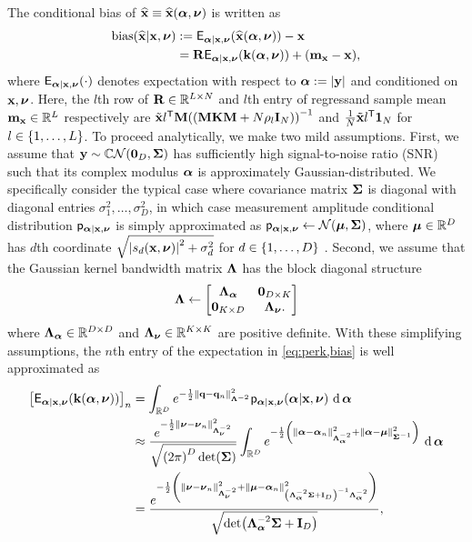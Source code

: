 The conditional bias 
of $\est{\bmx} \equiv \esta{\bmx}{\bmymag,\bmnu}$
is written as
\begin{align}
	\biasa{\est{\bmx}|\bmx,\bmnu} 
		&:= 
			\expect{\bmymag|\bmx,\bmnu}{\esta{\bmx}{\bmymag,\bmnu}} - \bmx
			\nonumber \\
		&= 
			\bmR \expect{\bmymag|\bmx,\bmnu}{\bmka{\bmymag,\bmnu}} 
			+ \paren{\bmmx-\bmx},
			\label{eq:perk,bias}
\end{align}
where $\expect{\bmymag|\bmx,\bmnu}{\cdot}$ 
denotes expectation
with respect to $\bmymag := \abs{\bmy}$
and conditioned on $\mathbf{x},\boldsymbol{\nu}$.
Here,
the $l$th row of $\mathbf{R} \in \mathbb{R}^{L \times N}$ 
and $l$th entry of regressand sample mean 
$\mathbf{m}_{\mathbf{x}} \in \mathbb{R}^{L}$
respectively are $\bmxt{l}\tpose \bmM\inv{\paren{\bmM\bmK\bmM + N \rho_l \eye{N}}}$
and $\frac{1}{N}\tilde{\mathbf{x}}{l}^{\mathsf{T}}\boldsymbol{1}_{N}$
for $l \in \set{1,\dots,L}$.
To proceed analytically, 
we make two mild assumptions.
First, 
we assume 
that $\bmy \sim \cgauss{\zeros{D}}{\bmSig}$
has sufficiently high signal-to-noise ratio (SNR)
such that its complex modulus $\boldsymbol{\alpha}$ 
is approximately Gaussian-distributed.
We specifically consider the typical case
where covariance matrix $\boldsymbol{\Sigma}$ is diagonal
with diagonal entries $\sigma_1^2,\dots,\sigma_D^2$,
in which case measurement amplitude conditional distribution 
$\mathsf{p}_{\boldsymbol{\alpha}|\mathbf{x},\boldsymbol{\nu}}$
is simply approximated as
$\dist{\bmymag|\bmx,\bmnu} \gets \gauss{\bmmu}{\bmSig}$,
where $\boldsymbol{\mu} \in \mathbb{R}^{D}$ 
has $d$th coordinate $\sqrt{\abs{s_d\paren{\bmx,\bmnu}}^2 + \sigma_d^2}$ 
for $d \in \set{1,\dots,D}$ \cite{gudbjartsson:95:trd}.
Second,
we assume
that the Gaussian kernel bandwidth matrix $\boldsymbol{\Lambda}$ 
has the block diagonal structure
\begin{align}
	\boldsymbol{\Lambda} \gets 
		\begin{bmatrix}
			\boldsymbol{\Lambda}_{\boldsymbol{\alpha}} & \boldsymbol{0}_{D \times K} \\
			\boldsymbol{0}_{K \times D} & \boldsymbol{\Lambda}_{\boldsymbol{\nu}}.
		\end{bmatrix}
	\label{eq:perk,sep-bw}
\end{align}
where $\boldsymbol{\Lambda}_{\boldsymbol{\alpha}} \in \mathbb{R}^{D \times D}$
and $\boldsymbol{\Lambda}_{\boldsymbol{\nu}} \in \mathbb{R}^{K \times K}$ 
are positive definite.
With these simplifying assumptions,
the $n$th entry 
of the expectation in \eqref{eq:perk,bias}
is well approximated as
\begin{align}
	\brac{\expect{\bmymag|\bmx,\bmnu}{\bmka{\bmymag,\bmnu}}}_n
		&=
			\int_{\reals{D}} e^{%
				-\frac{1}{2} \norm{\bmq-\bmq_n}^2_{\bmL^{-2}}
			}%
			\dista{\bmymag|\bmx,\bmnu} \der{\bmymag}
			\nonumber \\
		&\approx	
			\frac{e^{-\frac{1}{2}\norm{\bmnu-\bmnu_n}^2_{\bmLnu^{-2}}}}
			{\sqrt{\paren{2\pi}^D \det\paren{\bmSig}}}
			\int_{\reals{D}} e^{%
				-\frac{1}{2} \paren{%
					\norm{\bmymag-\bmymag_n}^2_{\bmLy^{-2}} + 
					\norm{\bmymag-\bmmu}^2_{\bmSig^{-1}}
				}%
			}%
			\der{\bmymag}
			\nonumber \\
		&=
			\frac{%
				e^{%
					-\frac{1}{2}\paren{%
						\norm{\bmnu-\bmnu_n}^2_{\bmLnu^{-2}} +
						\norm{\bmmu-\bmymag_n}^2_{\paren{\bmLy^{-2}\bmSig + \eye{D}}^{-1}\bmLy^{-2}}
					}%
				}
			}{%
				\sqrt{\det\paren{\bmLy^{-2}\bmSig + \eye{D}}}
			},
			\label{eq:perk,exp-bmk}
\end{align}
